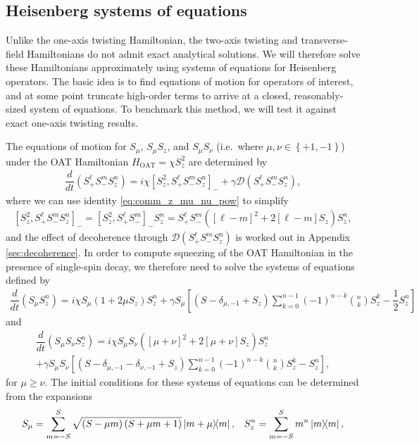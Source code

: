\documentclass[aps,notitlepage,nofootinbib,11pt]{revtex4-1}
\renewcommand{\t}{\text} %
\newcommand{\f}[2]{\dfrac{#1}{#2}} %
\newcommand{\p}[1]{\left(#1\right)} %
\renewcommand{\sp}[1]{\left[#1\right]} %
\renewcommand{\set}[1]{\left\{#1\right\}} %
\newcommand{\D}{\mathcal{D}}
\newcommand{\1}{\mathds{1}}
\begin{document}
\subsection{Heisenberg systems of equations}

Unlike the one-axis twisting Hamiltonian, the two-axis twisting and
transverse-field Hamiltonians do not admit exact analytical
solutions. We will therefore solve these Hamiltonians approximately
using systems of equations for Heisenberg operators.  The basic idea
is to find equations of motion for operators of interest, and at some
point truncate high-order terms to arrive at a closed,
reasonably-sized system of equations.  To benchmark this method, we
will test it against exact one-axis twisting results.

The equations of motion for $S_\mu$, $S_\mu S_z$, and $S_\mu S_\nu$
(i.e.~where $\mu,\nu\in\set{+1,-1}$) under the OAT Hamiltonian
$H_{\t{OAT}}=\chi S_z^2$ are determined by
\begin{align}
  \f{d}{dt} \p{S_+^\ell S_-^m S_z^n}
  = i\chi \sp{S_z^2, S_+^\ell S_-^m S_z^n}_-
  + \gamma \D\p{S_+^\ell S_-^m S_z^n},
\end{align}
where we can use identity \eqref{eq:comm_z_mu_nu_pow} to simplify
\begin{align}
  \sp{S_z^2, S_+^\ell S_-^m S_z^n}_-
  = \sp{S_z^2, S_+^\ell S_-^m}_- S_z^n
  = S_+^\ell S_-^m \p{\sp{\ell-m}^2 + 2\sp{\ell-m} S_z} S_z^n,
\end{align}
and the effect of decoherence through $\D\p{S_+^\ell S_-^m S_z^n}$ is
worked out in Appendix \ref{sec:decoherence}.  In order to compute
squeezing of the OAT Hamiltonian in the presence of single-spin decay,
we therefore need to solve the systems of equations defined by
\begin{align}
  \f{d}{dt} \p{S_\mu S_z^n}
  = i\chi S_\mu \p{1 + 2\mu S_z} S_z^n
  + \gamma S_\mu \sp{\p{S - \delta_{\mu,-1} + S_z} \sum_{k=0}^{n-1}
    \p{-1}^{n-k} { n \choose k } S_z^k - \f12 S_z^n}
\end{align}
and
\begin{multline}
  \f{d}{dt} \p{S_\mu S_\nu S_z^n}
  = i\chi S_\mu S_\nu \p{\sp{\mu+\nu}^2 + 2 \sp{\mu+\nu} S_z} S_z^n \\
  + \gamma S_\mu S_\nu
  \sp{\p{S - \delta_{\mu,-1} - \delta_{\nu,-1} + S_z} \sum_{k=0}^{n-1}
    \p{-1}^{n-k} { n \choose k } S_z^k - S_z^n},
\end{multline}
for $\mu\ge\nu$.  The initial conditions for these systems of equations can be determined from the expansions
\begin{align}
  S_\mu = \sum_{m=-S}^S \sqrt{\p{S-\mu m}\p{S+\mu m+1}} \op{m+\mu}{m},
  &&
  S_z^n = \sum_{m=-S}^S m^n \op{m},
\end{align}
\end{document}
